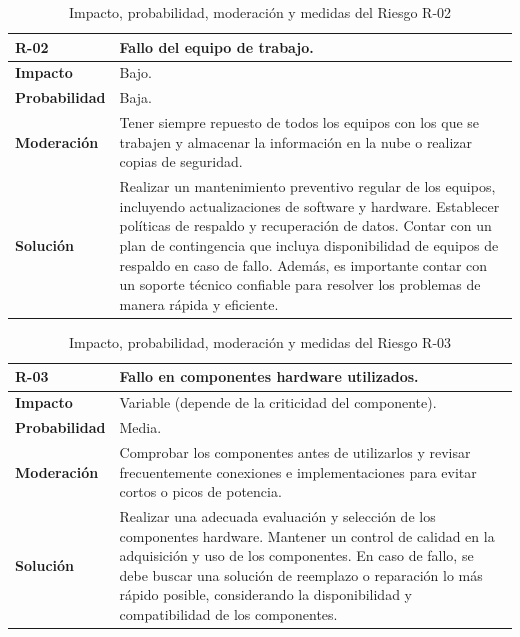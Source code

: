\begin{table}[htbp]
\begin{center}
\begin{tabular}{|l|p{12cm}|}
\hline
\textbf{R-02} & Fallo del equipo de trabajo. \\ \hline
\textbf{Impacto} & Bajo. \\ \hline
\textbf{Probabilidad} & Baja. \\ \hline
\textbf{Moderación} & Tener siempre repuesto de todos los equipos con los que se trabajen y almacenar la información en la nube o realizar copias de seguridad.\\ \hline
\textbf{Solución} & Realizar un mantenimiento preventivo regular de los equipos, incluyendo actualizaciones de software y hardware. Establecer políticas de respaldo y recuperación de datos. Contar con un plan de contingencia que incluya disponibilidad de equipos de respaldo en caso de fallo. Además, es importante contar con un soporte técnico confiable para resolver los problemas de manera rápida y eficiente.\\ \hline
\end{tabular}
\caption[Riesgo R-02]{Impacto, probabilidad, moderación y medidas del Riesgo R-02}
\label{tabla:r-02}
\end{center}
\end{table}  

\begin{table}[htbp]
\begin{center}
\begin{tabular}{|l|p{12cm}|}
\hline
\textbf{R-03} & Fallo en componentes hardware utilizados. \\ \hline
\textbf{Impacto} & Variable (depende de la criticidad del componente). \\ \hline
\textbf{Probabilidad} & Media. \\ \hline
\textbf{Moderación} & Comprobar los componentes antes de utilizarlos y revisar frecuentemente conexiones e implementaciones para evitar cortos o picos de potencia. \\ \hline
\textbf{Solución} & Realizar una adecuada evaluación y selección de los componentes hardware. Mantener un control de calidad en la adquisición y uso de los componentes. En caso de fallo, se debe buscar una solución de reemplazo o reparación lo más rápido posible, considerando la disponibilidad y compatibilidad de los componentes.\\ \hline
\end{tabular}
\caption[Riesgo R-03]{Impacto, probabilidad, moderación y medidas del Riesgo R-03}
\label{tabla:r-03}
\end{center}
\end{table} 

